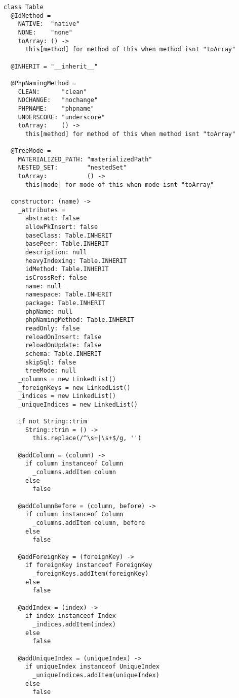 \begin{lstlisting}
class Table
  @IdMethod =
    NATIVE:  "native"
    NONE:    "none"
    toArray: () ->
      this[method] for method of this when method isnt "toArray"
      
  @INHERIT = "__inherit__"
      
  @PhpNamingMethod =
    CLEAN:      "clean"
    NOCHANGE:   "nochange"
    PHPNAME:    "phpname"
    UNDERSCORE: "underscore"
    toArray:    () ->
      this[method] for method of this when method isnt "toArray"
      
  @TreeMode =
    MATERIALIZED_PATH: "materializedPath"
    NESTED_SET:        "nestedSet"
    toArray:           () ->
      this[mode] for mode of this when mode isnt "toArray"
      
  constructor: (name) ->
    _attributes =
      abstract: false
      allowPkInsert: false
      baseClass: Table.INHERIT
      basePeer: Table.INHERIT
      description: null
      heavyIndexing: Table.INHERIT
      idMethod: Table.INHERIT
      isCrossRef: false
      name: null
      namespace: Table.INHERIT
      package: Table.INHERIT
      phpName: null
      phpNamingMethod: Table.INHERIT
      readOnly: false
      reloadOnInsert: false
      reloadOnUpdate: false
      schema: Table.INHERIT
      skipSql: false
      treeMode: null
    _columns = new LinkedList()
    _foreignKeys = new LinkedList()
    _indices = new LinkedList()
    _uniqueIndices = new LinkedList()
    
    if not String::trim
      String::trim = () ->
        this.replace(/^\s+|\s+$/g, '')
    
    @addColumn = (column) ->
      if column instanceof Column
        _columns.addItem column
      else
        false
        
    @addColumnBefore = (column, before) ->
      if column instanceof Column
        _columns.addItem column, before
      else
        false
        
    @addForeignKey = (foreignKey) ->
      if foreignKey instanceof ForeignKey
        _foreignKeys.addItem(foreignKey)
      else
        false
        
    @addIndex = (index) ->
      if index instanceof Index
        _indices.addItem(index)
      else
        false
        
    @addUniqueIndex = (uniqueIndex) ->
      if uniqueIndex instanceof UniqueIndex
        _uniqueIndices.addItem(uniqueIndex)
      else
        false
    

\end{lstlisting}
